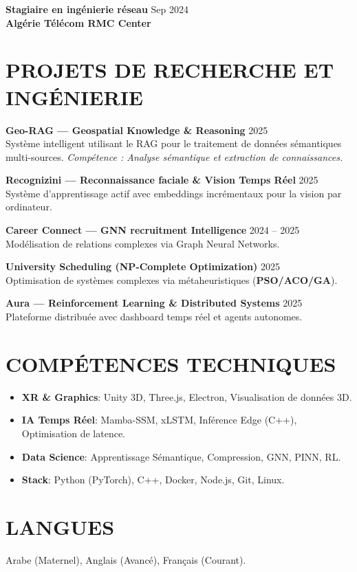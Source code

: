 \documentclass[a4paper,11pt]{article}
\begin{document}
\textbf{Stagiaire en ingénierie réseau} \hfill Sep 2024 \\
\textbf{Algérie Télécom RMC Center}

\section{PROJETS DE RECHERCHE ET INGÉNIERIE}

\textbf{Geo-RAG — Geospatial Knowledge \& Reasoning} \hfill 2025 \\
Système intelligent utilisant le RAG pour le traitement de données sémantiques multi-sources.
\textit{Compétence : Analyse sémantique et extraction de connaissances.}

\textbf{Recognizini — Reconnaissance faciale \& Vision Temps Réel} \hfill 2025 \\
Système d'apprentissage actif avec embeddings incrémentaux pour la vision par ordinateur.

\textbf{Career Connect — GNN recruitment Intelligence} \hfill 2024 -- 2025 \\
Modélisation de relations complexes via Graph Neural Networks.

\textbf{University Scheduling (NP-Complete Optimization)} \hfill 2025 \\
Optimisation de systèmes complexes via métaheuristiques (\textbf{PSO/ACO/GA}).

\textbf{Aura — Reinforcement Learning \& Distributed Systems} \hfill 2025 \\
Plateforme distribuée avec dashboard temps réel et agents autonomes.

\section{COMPÉTENCES TECHNIQUES}
\begin{itemize}
    \item \textbf{XR \& Graphics}: Unity 3D, Three.js, Electron, Visualisation de données 3D.
    \item \textbf{IA Temps Réel}: Mamba-SSM, xLSTM, Inférence Edge (C++), Optimisation de latence.
    \item \textbf{Data Science}: Apprentissage Sémantique, Compression, GNN, PINN, RL.
    \item \textbf{Stack}: Python (PyTorch), C++, Docker, Node.js, Git, Linux.
\end{itemize}

\section{LANGUES}
Arabe (Maternel), Anglais (Avancé), Français (Courant).
\end{document}

